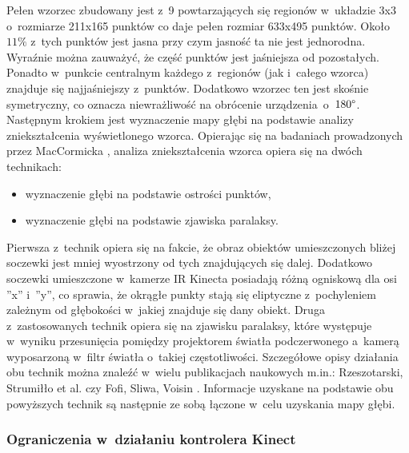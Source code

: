 Pełen wzorzec zbudowany jest z~9 powtarzających się regionów w~układzie 3x3 o~rozmiarze 211x165 punktów co daje pełen rozmiar 633x495 punktów. Około $11\%$ z~tych punktów jest jasna przy czym jasność ta nie jest jednorodna. Wyraźnie można zauważyć, że część punktów jest jaśniejsza od pozostałych. Ponadto w~punkcie centralnym każdego z~regionów (jak i~całego wzorca) znajduje się najjaśniejszy z~punktów. Dodatkowo wzorzec ten jest skośnie symetryczny, co oznacza niewrażliwość na obrócenie urządzenia~o~$180\degree$.\\
																																	
Następnym krokiem jest wyznaczenie mapy głębi na podstawie analizy zniekształcenia wyświetlonego wzorca. Opierając się na badaniach prowadzonych przez MacCormicka \cite{MacCormick2011}, analiza zniekształcenia wzorca opiera się na dwóch technikach:
																																	
\begin{itemize}
	\item wyznaczenie głębi na podstawie ostrości punktów,
	\item wyznaczenie głębi na podstawie zjawiska paralaksy.
\end{itemize}
																																	
Pierwsza z~technik opiera się na fakcie, że obraz obiektów umieszczonych bliżej soczewki jest mniej wyostrzony od tych znajdujących się dalej. Dodatkowo soczewki umieszczone w~kamerze IR Kinecta posiadają różną ogniskową dla osi ''x'' i~''y'', co sprawia, że okrągłe punkty stają się eliptyczne z~pochyleniem zależnym od głębokości w~jakiej znajduje się dany obiekt. Druga z~zastosowanych technik opiera się na zjawisku paralaksy, które występuje w~wyniku przesunięcia pomiędzy projektorem światła podczerwonego a~kamerą wyposarzoną w~filtr światła o~takiej częstotliwości. Szczegółowe opisy działania obu technik można znaleźć w~wielu publikacjach naukowych m.in.: Rzeszotarski, Strumiłło et al. \cite{Rzeszotarski2006} czy Fofi, Sliwa, Voisin \cite{Fofi2004}. Informacje uzyskane na podstawie obu powyższych technik są następnie ze sobą łączone w~celu uzyskania mapy głębi.
																																	
\subsubsection*{Ograniczenia w~działaniu kontrolera Kinect}\label{ssec:characteristics:kinect:limitation}
																																	

